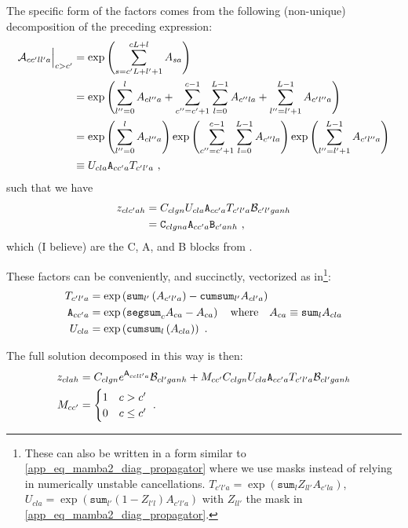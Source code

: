The specific form of the factors comes from the following (non-unique) decomposition of the
preceding expression:
\begin{align}
    \mathcal{A}_{ cc'll'a }\Big|_{ c>c' } &=\exp \left ( \sum_{ s= c'L + l' + 1 }^{ cL + l  }A _{ sa } \right ) \nonumber\\
                            &= \exp \left (\sum _{ l''=0 }^{ l }A_{ cl''a} +\sum_{ c''=c'+1 }^{ c-1 }\sum_{ l=0 }^{ L-1 }A_{ c''la }  + \sum _{ l''=l'+1 }^{ L-1  }A_{ c'l''a} \right )\nonumber\\
                            &= \exp \left (\sum _{ l''=0 }^{ l }A_{ cl''a}\right ) \exp \left (\sum_{ c''=c'+1 }^{ c-1 }\sum_{ l=0 }^{ L-1 }A_{ c''la }  \right ) \exp \left ( \sum _{ l''=l'+1 }^{ L-1  }A_{ c'l''a} \right ) \nonumber\\
                            &\equiv U_{ cla }\texttt{A}_{ cc'a }T_{ c'l'a }\ ,
\end{align}
such that we have
\begin{align}
z_{ clc'ah }&= C _{ clgn }U_{ cla }\texttt{A}_{ cc'a }T_{ c'l'a }\mathcal{B}_{ c'l'ganh }\nonumber\\
            &= \texttt{C}_{ clgna }\texttt{A}_{ cc'a }\texttt{B}_{ c'anh }\ ,
\end{align}
which (I believe) are the C, A, and B blocks from \cite{dao2024transformersssmsgeneralizedmodels}.


These factors can be conveniently, and succinctly, vectorized as in\footnote{These can also be written in a form
similar to \eqref{app_eq_mamba2_diag_propagator} where we use masks instead of relying in
numerically unstable cancellations. $ T_{ c'l'a  }= \exp\left (\texttt{sum}_{ l }Z_{ ll' }A_{ c'la
}\right ) $, $ U_{ cla  }= \exp\left (\texttt{sum}_{ l' }\left (1 - Z_{ l'l }\right )A_{ c'l'a  }\right ) $
with $ Z_{ ll' } $ the mask in \eqref{app_eq_mamba2_diag_propagator}.
}:
\begin{align}
    T_{ c'l'a } &=\exp\left ( \texttt{sum}_{ l' }\left ( A_{ c'l'a } \right ) - \texttt{cumsum}_{ l' }A_{ cl'a } \right )\nonumber\\
    \texttt{A}_{ cc'a }&=\exp \left ( \texttt{segsum}_{ c }A_{ ca } - A_{ ca }  \right ) \quad {\rm where}  \quad A_{ ca  }\equiv \texttt{sum}_{ l }A_{ cla  }\nonumber\\
    U_{ cla } &=\exp\left ( \texttt{cumsum}_{ l }\left ( A_{ cla } \right ) \right ) \ .
\end{align}

The full solution decomposed in this way is then:
\begin{align}
    z _{ clah } &= C _{ clgn }e^{ \mathsf{A}_{ ccll'a } }\mathcal{B}_{ cl'ganh } + M_{ cc' }C _{ clgn }U_{ cla }\texttt{A}_{ cc'a }T_{ c'l'a }\mathcal{B}_{ cl'ganh }\nonumber\\
    M_{ cc' } & = \begin{cases}
           1 & c > c'\\
           0 & c \le c'
       \end{cases} \ .
\end{align}


